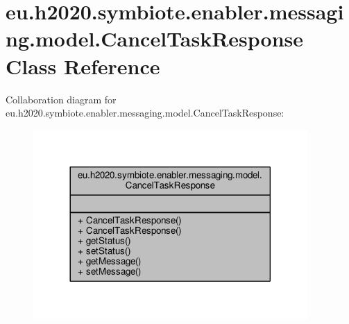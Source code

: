 \hypertarget{classeu_1_1h2020_1_1symbiote_1_1enabler_1_1messaging_1_1model_1_1CancelTaskResponse}{}\section{eu.\+h2020.\+symbiote.\+enabler.\+messaging.\+model.\+Cancel\+Task\+Response Class Reference}
\label{classeu_1_1h2020_1_1symbiote_1_1enabler_1_1messaging_1_1model_1_1CancelTaskResponse}


Collaboration diagram for eu.\+h2020.\+symbiote.\+enabler.\+messaging.\+model.\+Cancel\+Task\+Response\+:\nopagebreak
\begin{figure}[H]
\begin{center}
\leavevmode
\includegraphics[width=296pt]{classeu_1_1h2020_1_1symbiote_1_1enabler_1_1messaging_1_1model_1_1CancelTaskResponse__coll__graph}
\end{center}
\end{figure}
